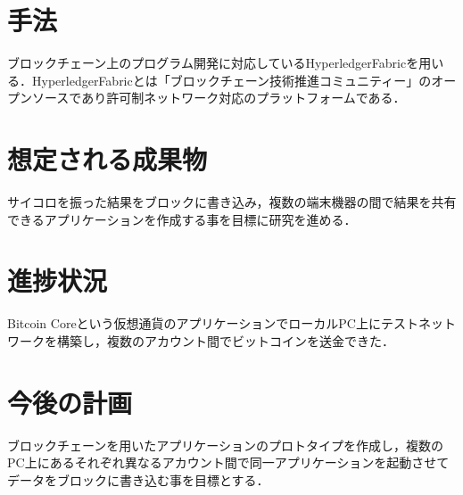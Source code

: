 \documentclass[uplatex,twocolumn,dvipdfmx]{jsarticle}
\begin{document}
\section{手法}
ブロックチェーン上のプログラム開発に対応しているHyperledgerFabricを用いる．HyperledgerFabricとは「ブロックチェーン技術推進コミュニティー」のオープンソースであり許可制ネットワーク対応のプラットフォームである．


\section{想定される成果物}
サイコロを振った結果をブロックに書き込み，複数の端末機器の間で結果を共有できるアプリケーションを作成する事を目標に研究を進める．

\section{進捗状況}
Bitcoin Coreという仮想通貨のアプリケーションでローカルPC上にテストネットワークを構築し，複数のアカウント間でビットコインを送金できた．

\section{今後の計画}

ブロックチェーンを用いたアプリケーションのプロトタイプを作成し，複数のPC上にあるそれぞれ異なるアカウント間で同一アプリケーションを起動させてデータをブロックに書き込む事を目標とする．


\end{document}
